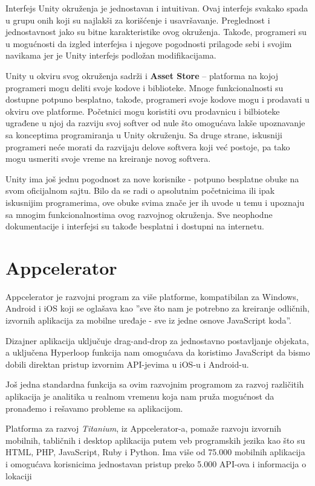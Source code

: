 \documentclass[12pt]{article}
\begin{document}
Interfejs Unity okruženja je jednostavan i intuitivan. 
Ovaj interfejs svakako spada u grupu onih koji su najlakši za korišćenje i usavršavanje. Preglednost i jednostavnost jako su bitne karakteristike
ovog okruženja. Takođe, programeri su u mogućnosti da izgled interfejsa i njegove pogodnosti prilagode sebi i svojim navikama jer je Unity interfejs
podložan modifikacijama. 

Unity u okviru svog okruženja sadrži i \textbf{Asset Store} – platforma na kojoj programeri mogu deliti svoje kodove i biblioteke. Mnoge funkcionalnosti su dostupne potpuno besplatno, takođe, programeri svoje kodove mogu i prodavati u okviru ove platforme. Početnici mogu koristiti ovu prodavnicu i bilbioteke ugrađene u njoj da razviju svoj softver od nule što omogućava lakše upoznavanje sa konceptima programiranja u Unity okruženju.
Sa druge strane, iskusniji programeri neće morati da razvijaju delove softvera koji već postoje, pa tako mogu usmeriti svoje vreme na kreiranje novog softvera.

Unity ima još jednu pogodnost za nove korisnike - potpuno besplatne obuke na svom oficijalnom sajtu.
Bilo da se radi o apsolutnim početnicima ili ipak iskusnijim programerima, ove obuke svima znače jer ih uvode u temu i upoznaju sa mnogim funkcionalnostima ovog razvojnog okruženja.
Sve neophodne dokumentacije i interfejsi su takođe besplatni i dostupni na internetu.

\section{Appcelerator}
Appcelerator je razvojni program za više platforme, kompatibilan za Windows, Android i iOS koji se oglašava kao  ''sve što nam je potrebno za kreiranje odličnih, izvornih aplikacija za mobilne uređaje - sve iz jedne osnove JavaScript koda''.

Dizajner aplikacija uključuje drag-and-drop za jednostavno postavljanje objekata, a uključena Hyperloop funkcija nam omogućava da koristimo JavaScript da bismo dobili direktan pristup izvornim API-jevima u iOS-u i Android-u.

Još jedna standardna funkcija sa ovim razvojnim programom za razvoj različitih aplikacija je analitika u realnom vremenu koja nam pruža mogućnost da pronađemo i rešavamo probleme sa aplikacijom.

Platforma za razvoj \textit{Titanium}, iz Appcelerator-a, pomaže razvoju izvornih mobilnih, tabličnih i desktop aplikacija putem veb programskih jezika kao što su HTML, PHP, JavaScript, Ruby i Python. Ima više od 75.000 mobilnih aplikacija i omogućava korisnicima jednostavan pristup preko 5.000 API-ova i informacija o lokaciji
\end{document}
